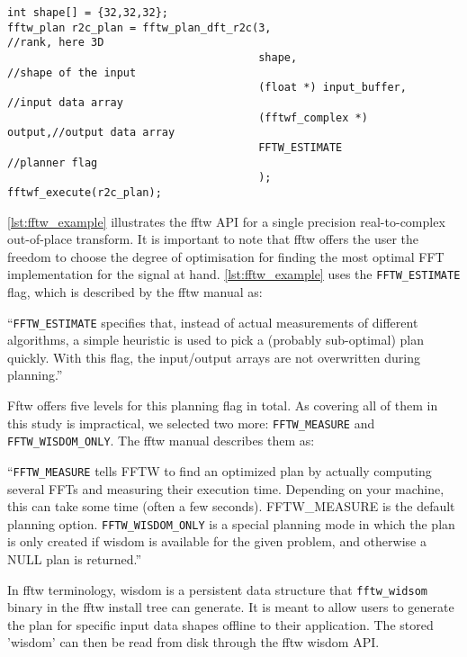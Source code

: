 \begin{lstlisting}[caption={Minimal usage example of the FFTW single precision real-to-complex planner API. Memory management is omitted.},label={lst:fftw_example}]
int shape[] = {32,32,32};
fftw_plan r2c_plan = fftw_plan_dft_r2c(3,                       //rank, here 3D 
                                       shape,                   //shape of the input
                                       (float *) input_buffer,  //input data array
                                       (fftwf_complex *) output,//output data array
                                       FFTW_ESTIMATE            //planner flag
                                       );
fftwf_execute(r2c_plan);
\end{lstlisting}

\cref{lst:fftw_example} illustrates the fftw API for a single precision real-to-complex out-of-place transform. It is important to note that fftw offers the user the freedom to choose the degree of optimisation for finding the most optimal FFT implementation for the signal at hand. \cref{lst:fftw_example} uses the \texttt{FFTW\_ESTIMATE} flag, which is described by the fftw manual \cite{fftw_manual} as:

\begin{center}
  ``\texttt{FFTW\_ESTIMATE} specifies that, instead of actual measurements of different algorithms, a simple heuristic is used to pick a (probably sub-optimal) plan quickly. With this flag, the input/output arrays are not overwritten during planning.''
\end{center}

Fftw offers five levels for this planning flag in total. As covering all of them in this study is impractical, we selected two more: \texttt{FFTW\_MEASURE} and \texttt{FFTW\_WISDOM\_ONLY}. The fftw manual describes them as:

\begin{center}
  ``\texttt{FFTW\_MEASURE} tells FFTW to find an optimized plan by actually computing several FFTs and measuring their execution time. Depending on your machine, this can take some time (often a few seconds). FFTW\_MEASURE is the default planning option.\newline
  \texttt{FFTW\_WISDOM\_ONLY} is a special planning mode in which the plan is only created if wisdom is available for the given problem, and otherwise a NULL plan is returned.''
\end{center}

In fftw terminology, wisdom is a persistent data structure that \texttt{fftw\_widsom} binary in the fftw install tree can generate. It is meant to allow users to generate the plan for specific input data shapes offline to their application. The stored 'wisdom' can then be read from disk through the fftw wisdom API. 

